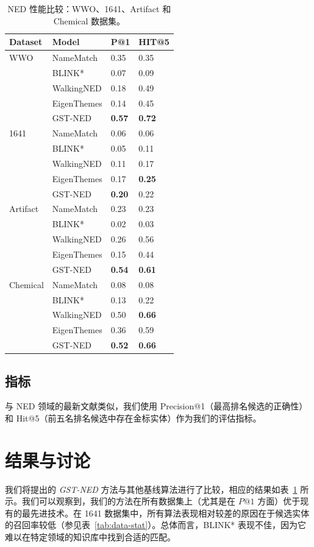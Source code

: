 \documentclass[11pt]{article}
\begin{document}
\begin{table}[htbp]
\centering
\begin{tabular}{p{2cm}p{2cm}p{1cm}p{1cm}}
Dataset & Model & P@1 & HIT@5\\[0pt]
\hline
 WWO
 & NameMatch	& 0.35 & 0.35 \\
 & BLINK* & 0.07 & 0.09 \\
 & WalkingNED & 0.18 & 0.49\\
 & EigenThemes & 0.14 & 0.45\\
 & GST-NED & \textbf{0.57} & \textbf{0.72}\\
\hline
 1641
 & NameMatch & 0.06 & 0.06 \\
 & BLINK* & 0.05	& 0.11 \\
 & WalkingNED & 0.11 & 0.17\\
 & EigenThemes & 0.17 & \textbf{0.25}\\
 & GST-NED & \textbf{0.20} & 0.22 \\
\hline
Artifact
 & NameMatch & 0.23 & 0.23 \\
 & BLINK* & 0.02	& 0.03 \\
 & WalkingNED & 0.26 & 0.56\\
 & EigenThemes & 0.15 & 0.44\\
 & GST-NED & \textbf{0.54} & \textbf{0.61} \\
\hline
 Chemical
 & NameMatch	& 0.08 & 0.08 \\
 & BLINK* & 0.13 & 0.22 \\
 & WalkingNED & 0.50 & \textbf{0.66}\\
 & EigenThemes & 0.36 & 0.59\\
 & GST-NED & \textbf{0.52} & \textbf{0.66}\\
 \hline
\end{tabular}
\caption{\label{tab:org1c6e60d} NED 性能比较：WWO、1641、Artifact 和 Chemical 数据集。}
\end{table}
\subsection{指标}
与 NED 领域的最新文献类似，我们使用 Precision@1（最高排名候选的正确性）和 Hit@5（前五名排名候选中存在金标实体）作为我们的评估指标。
\section{结果与讨论}
我们将提出的 \emph{GST-NED} 方法与其他基线算法进行了比较，相应的结果如表~\ref{tab:org1c6e60d} 所示。我们可以观察到，我们的方法在所有数据集上（尤其是在 $P@1$ 方面）优于现有的最先进技术。在 1641 数据集中，所有算法表现相对较差的原因在于候选实体的召回率较低（参见表~\ref{tab:data-stat}）。总体而言，BLINK* 表现不佳，因为它难以在特定领域的知识库中找到合适的匹配。
\end{document}
